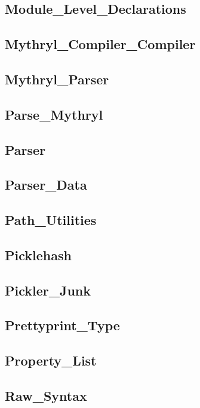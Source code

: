 \subsection{Module\_Level\_Declarations}		
\subsection{Mythryl\_Compiler\_Compiler}		
\subsection{Mythryl\_Parser}				
\subsection{Parse\_Mythryl}				
\subsection{Parser}					
\subsection{Parser\_Data}				
\subsection{Path\_Utilities}				
\subsection{Picklehash}					
\subsection{Pickler\_Junk}				
\subsection{Prettyprint\_Type}				
\subsection{Property\_List}				
\subsection{Raw\_Syntax}				
